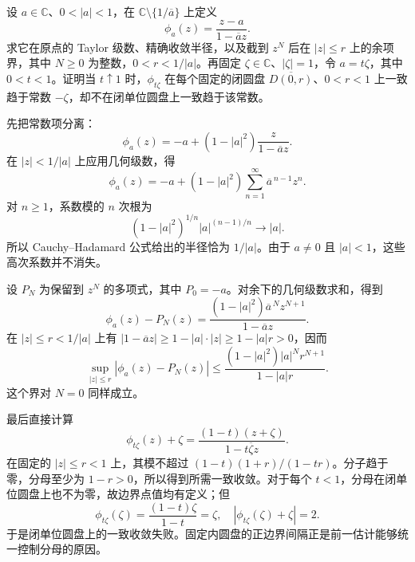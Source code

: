 \begin{exercise}\label{b3:ex:01-disk-distance-ratio}
设 \(a\in\mathbb C\)、\(0<|a|<1\)，在 \(\mathbb C\setminus\{1/\overline a\}\) 上定义
\[
  \phi_a(z)=\frac{z-a}{1-\overline a z}.
\]
求它在原点的 Taylor 级数、精确收敛半径，以及截到 \(z^N\) 后在 \(|z|\le r\) 上的余项界，其中 \(N\ge0\) 为整数，\(0<r<1/|a|\)。再固定 \(\zeta\in\mathbb C\)、\(|\zeta|=1\)，令 \(a=t\zeta\)，其中 \(0<t<1\)。证明当 \(t\uparrow1\) 时，\(\phi_{t\zeta}\) 在每个固定的闭圆盘 \(\overline{D(0,r)}\)、\(0<r<1\) 上一致趋于常数 \(-\zeta\)，却不在闭单位圆盘上一致趋于该常数。
\end{exercise}
\begin{solution}
先把常数项分离：
\[
  \phi_a(z)=-a+(1-|a|^2)\frac{z}{1-\overline a z}.
\]
在 \(|z|<1/|a|\) 上应用几何级数，得
\[
  \phi_a(z)=-a+(1-|a|^2)
       \sum_{n=1}^{\infty}\overline a^{\,n-1}z^n.
\]
对 \(n\ge1\)，系数模的 \(n\) 次根为
\[
  (1-|a|^2)^{1/n}|a|^{(n-1)/n}\longrightarrow|a|.
\]
所以 Cauchy--Hadamard 公式给出的半径恰为 \(1/|a|\)。由于 \(a\ne0\) 且 \(|a|<1\)，这些高次系数并不消失。

设 \(P_N\) 为保留到 \(z^N\) 的多项式，其中 \(P_0=-a\)。对余下的几何级数求和，得到
\[
  \phi_a(z)-P_N(z)
  =\frac{(1-|a|^2)\overline a^{\,N}z^{N+1}}
         {1-\overline a z}.
\]
在 \(|z|\le r<1/|a|\) 上有
\(|1-\overline a z|\ge1-|a|\cdot|z|\ge1-|a|r>0\)，因而
\[
  \sup_{|z|\le r}|\phi_a(z)-P_N(z)|
  \le\frac{(1-|a|^2)|a|^N r^{N+1}}{1-|a|r}.
\]
这个界对 \(N=0\) 同样成立。

最后直接计算
\[
  \phi_{t\zeta}(z)+\zeta
  =\frac{(1-t)(z+\zeta)}{1-t\overline\zeta z}.
\]
在固定的 \(|z|\le r<1\) 上，其模不超过
\((1-t)(1+r)/(1-tr)\)。分子趋于零，分母至少为 \(1-r>0\)，所以得到所需一致收敛。对于每个 \(t<1\)，分母在闭单位圆盘上也不为零，故边界点值均有定义；但
\[
  \phi_{t\zeta}(\zeta)=\frac{(1-t)\zeta}{1-t}=\zeta,
  \quad |\phi_{t\zeta}(\zeta)+\zeta|=2.
\]
于是闭单位圆盘上的一致收敛失败。固定内圆盘的正边界间隔正是前一估计能够统一控制分母的原因。
\end{solution}

